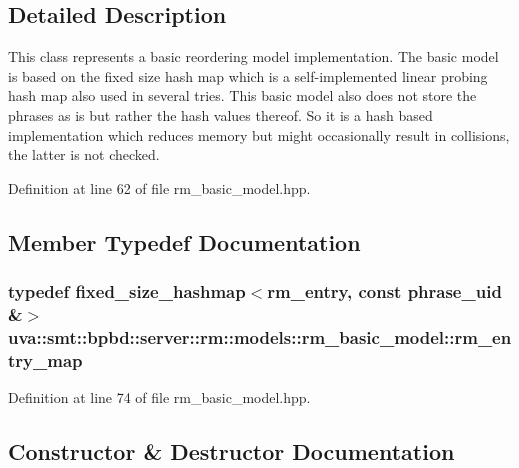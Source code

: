 \subsection{Detailed Description}
This class represents a basic reordering model implementation. The basic model is based on the fixed size hash map which is a self-\/implemented linear probing hash map also used in several tries. This basic model also does not store the phrases as is but rather the hash values thereof. So it is a hash based implementation which reduces memory but might occasionally result in collisions, the latter is not checked. 

Definition at line 62 of file rm\+\_\+basic\+\_\+model.\+hpp.



\subsection{Member Typedef Documentation}
\hypertarget{classuva_1_1smt_1_1bpbd_1_1server_1_1rm_1_1models_1_1rm__basic__model_a64429cdf5101527707c9ff2b1bbbb40a}{}
\subsubsection[{rm\+\_\+entry\+\_\+map}]{\setlength{\rightskip}{0pt plus 5cm}typedef {\bf fixed\+\_\+size\+\_\+hashmap}$<${\bf rm\+\_\+entry}, const {\bf phrase\+\_\+uid} \&$>$ {\bf uva\+::smt\+::bpbd\+::server\+::rm\+::models\+::rm\+\_\+basic\+\_\+model\+::rm\+\_\+entry\+\_\+map}}\label{classuva_1_1smt_1_1bpbd_1_1server_1_1rm_1_1models_1_1rm__basic__model_a64429cdf5101527707c9ff2b1bbbb40a}


Definition at line 74 of file rm\+\_\+basic\+\_\+model.\+hpp.



\subsection{Constructor \& Destructor Documentation}
\hypertarget{classuva_1_1smt_1_1bpbd_1_1server_1_1rm_1_1models_1_1rm__basic__model_ab80e9cf546e8cadf421663fa156b0ec8}{}
